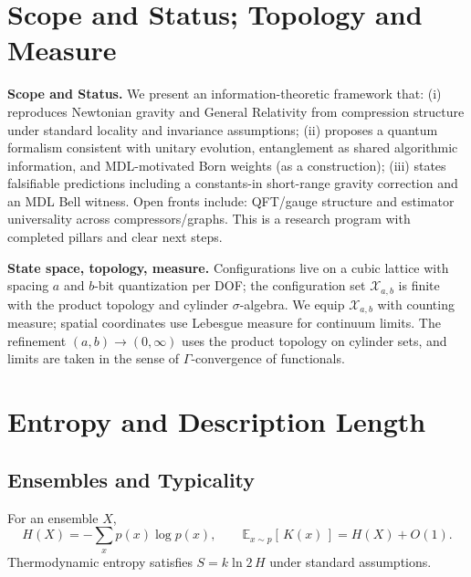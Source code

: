 \documentclass[aps,preprint,onecolumn,longbibliography,nofootinbib]{revtex4-2}
\numberwithin{equation}{section}        %
\begin{document}
\section{Scope and Status; Topology and Measure}
\textbf{Scope and Status.} We present an information-theoretic framework that:
(i) reproduces Newtonian gravity and General Relativity from compression structure under standard locality and invariance assumptions; (ii) proposes a quantum formalism consistent with unitary evolution, entanglement as shared algorithmic information, and MDL-motivated Born weights (as a construction); (iii) states falsifiable predictions including a constants-in short-range gravity correction and an MDL Bell witness.
Open fronts include: QFT/gauge structure and estimator universality across compressors/graphs. This is a research program with completed pillars and clear next steps.

\textbf{State space, topology, measure.} Configurations live on a cubic lattice with spacing $a$ and $b$-bit quantization per DOF; the configuration set $\mathcal X_{a,b}$ is finite with the product topology and cylinder $\sigma$-algebra. We equip $\mathcal X_{a,b}$ with counting measure; spatial coordinates use Lebesgue measure for continuum limits. The refinement $(a,b)\to (0,\infty)$ uses the product topology on cylinder sets, and limits are taken in the sense of $\Gamma$-convergence of functionals.

\section{Entropy and Description Length}

\subsection{Ensembles and Typicality}
For an ensemble $X$,
\begin{equation}
H(X) = -\sum_x p(x)\log p(x), \qquad
\mathbb{E}_{x\sim p}[\,K(x)\,] = H(X) + O(1). \label{eq:shannonK}
\end{equation}
Thermodynamic entropy satisfies $S = k\ln 2 \, H$ under standard assumptions.
\end{document}
